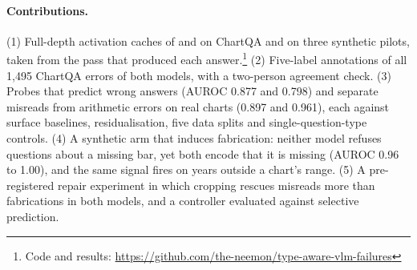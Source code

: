 \paragraph{Contributions.} (1) Full-depth activation caches of
\qwen and \llava on ChartQA and on three synthetic pilots, taken from the pass
that produced each answer.\footnote{Code and results:
\url{https://github.com/the-neemon/type-aware-vlm-failures}} (2) Five-label annotations of all 1,495 ChartQA
errors of both models, with a two-person agreement check. (3) Probes that
predict wrong answers (AUROC 0.877 and 0.798) and separate misreads from
arithmetic errors on real charts (0.897 and 0.961), each against surface
baselines, residualisation, five data splits and single-question-type
controls. (4) A synthetic arm that induces fabrication: neither model refuses
questions about a missing bar, yet both encode that it is missing (AUROC 0.96 to
1.00), and the same signal fires on years outside a chart's range. (5) A
pre-registered repair experiment in which cropping rescues misreads more than
fabrications in both models, and a controller evaluated against selective
prediction.
